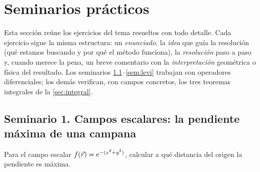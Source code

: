 \section{Seminarios prácticos}\label{sec:seminarios}
Esta sección reúne los ejercicios del tema resueltos con todo detalle. Cada
ejercicio sigue la misma estructura: un \emph{enunciado}, la \emph{idea} que
guía la resolución (qué estamos buscando y por qué el método funciona), la
\emph{resolución} paso a paso y, cuando merece la pena, un breve comentario con
la \emph{interpretación} geométrica o física del resultado. Los seminarios
\ref{sem:pendiente}--\ref{sem:levi} trabajan con operadores diferenciales;
los demás verifican, con campos concretos, los tres teoremas integrales de la
\cref{sec:integral}.

\subsection{Seminario 1. Campos escalares: la pendiente máxima de una campana}\label{sem:pendiente}
\begin{ejercicio}\label{ejer:pendiente}
Para el campo escalar $f(\vec{r})=\mathrm{e}^{-(x^{2}+y^{2})}$, calcular a qué distancia
del origen la pendiente es máxima.
\end{ejercicio}

